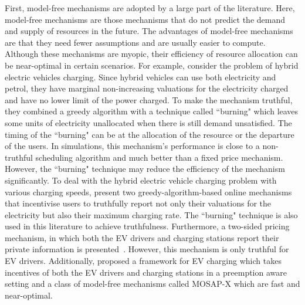 \documentclass[11pt]{phdthesis}
\begin{document}

First, model-free mechanisms are adopted by a large part of the literature. Here, model-free mechanisms are those mechanisms that do not predict the demand and supply of resources in the future. The advantages of model-free mechanisms are that they need fewer assumptions and are usually easier to compute. Although these mechanisms are myopic, their efficiency of resource allocation can be near-optimal in certain scenarios. For example,
\citet{gerding2011online} consider the problem of hybrid electric vehicles charging. Since hybrid vehicles can use both electricity and petrol, they have marginal non-increasing valuations for the electricity charged and have no lower limit of the power charged. To make the mechanism truthful, they combined a greedy algorithm with a technique called ``burning" which leaves some units of electricity unallocated when there is still demand unsatisfied. The timing of the ``burning" can be at the allocation of the resource or the departure of the users. In simulations, this mechanism's performance is close to a non-truthful scheduling algorithm and much better than a fixed price mechanism. However, the ``burning" technique may reduce the efficiency of the mechanism significantly. To deal with the hybrid electric vehicle charging problem with various charging speeds, \citet{robu2011online} present two greedy-algorithm-based online mechanisms that incentivise users to truthfully report not only their valuations for the electricity but also their maximum charging rate. The ``burning" technique is also used in this literature to achieve truthfulness. Furthermore, a two-sided pricing mechanism, in which both the EV drivers and charging stations report their private information is presented~\citep{gerding2013two}. However, this mechanism is only truthful for EV drivers. Additionally, \citet{nejad2017online} proposed a framework for EV charging which takes incentives of both the EV drivers and charging stations in a preemption aware setting and a class of model-free mechanisms called MOSAP-X which are fast and near-optimal. 
\end{document}
